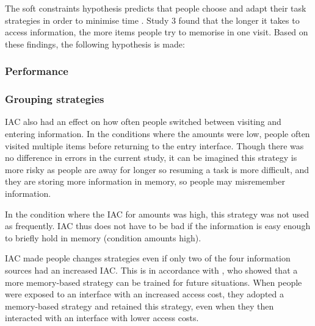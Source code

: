 \begin{table}
\begin{itemize}
The soft constraints hypothesis predicts that people choose and adapt their task strategies in order to minimise time \citep{Gray2006}. Study 3 found that the longer it takes to access information, the more items people try to memorise in one visit. Based on these findings, the following hypothesis is made: 

\subsubsection{Performance}

\subsubsection{Grouping strategies}
IAC also had an effect on how often people switched between visiting and entering information. In the conditions where the amounts were low, people often visited multiple items before returning to the entry interface. Though there was no difference in errors in the current study, it can be imagined this strategy is more risky as people are away for longer so resuming a task is more difficult, and they are storing more information in memory, so people may misremember information.

In the condition where the IAC for amounts was high, this strategy was not used as frequently. 
IAC thus does not have to be bad if the information is easy enough to briefly hold in memory (condition amounts high).

IAC made people changes strategies even if only two of the four information sources had an increased IAC. This is in accordance with \citep{Morgan2014}, who showed that a more memory-based strategy can be trained for future situations. When people were exposed to an interface with an increased access cost, they adopted a memory-based strategy and retained this strategy, even when they then interacted with an interface with lower access costs.



\end{itemize}
\end{table}
